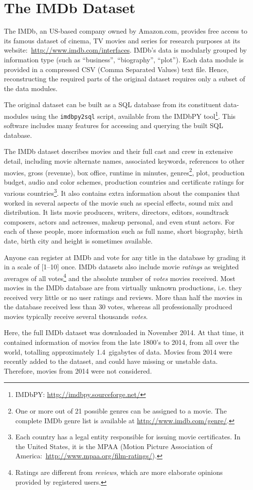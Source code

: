 \section{The IMDb Dataset}
\label{sec:foundamentals:dataset}
The IMDb, an US-based company owned by Amazon.com, provides free access to its
famous dataset of cinema, TV movies and series for research purposes at its
website:~\url{http://www.imdb.com/interfaces}. IMDb's data is modularly grouped
by information type (such as ``business'', ``biography'', ``plot''). Each data
module is provided in a compressed CSV (Comma Separated Values) text file.
Hence, reconstructing the required parts of the original dataset requires only
a subset of the data modules.

The original dataset can be built as a SQL database from its constituent
data-modules using the \texttt{imdbpy2sql} script, available from the IMDbPY
tool\footnote{IMDbPY\@: \url{http://imdbpy.sourceforge.net/}}. This software
includes many features for accessing and querying the built SQL database.

The IMDb dataset describes movies and their full cast and crew in extensive
detail, including movie alternate names, associated keywords, references to
other movies, gross (revenue), box office, runtime in minutes,
genres\footnote{One or more out of 21 possible genres can be assigned to a
movie. The complete IMDb genre list is available at
\url{http://www.imdb.com/genre/}.}, plot, production budget, audio and color
schemes, production countries and certificate ratings for various
countries\footnote{Each country has a legal entity responsible for issuing
movie certificates. In the United States, it is the MPAA (Motion Picture
Association of America:~\url{http://www.mpaa.org/film-ratings/}).}. It also
contains extra information about the companies that worked in several aspects
of the movie such as special effects, sound mix and distribution. It lists
movie producers, writers, directors, editors, soundtrack composers, actors and
actresses, makeup personal, and even stunt actors. For each of these people,
more information such as full name, short biography, birth date, birth city and
height is sometimes available.

Anyone can register at IMDb and vote for any title in the database by grading
it in a scale of [1--10] once. IMDb datasets also include movie
\textit{ratings} as weighted averages of all votes\footnote{Ratings are
different from \textit{reviews}, which are more elaborate opinions provided by
registered users.} and the absolute number of \textit{votes} movies received.
Most movies in the IMDb database are from virtually unknown productions, i.e.\@
they received very little or no user ratings and reviews. More than half the
movies in the database received less than 30 votes, whereas all professionally
produced movies typically receive several thousands \textit{votes}.

Here, the full IMDb dataset was downloaded in November 2014. At that
time, it contained information of movies from the late 1800's to 2014, from all
over the world, totalling approximately 1.4~gigabytes of data. Movies
from 2014 were recently added to the dataset, and could have missing or
unstable data. Therefore, movies from 2014 were not considered.
